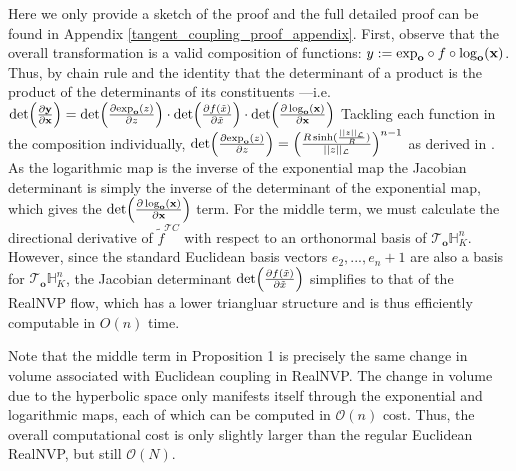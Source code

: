 \begin{proofsketch}
Here we only provide a sketch of the proof and the full detailed proof can be found in Appendix \ref{tangent_coupling_proof_appendix}. First, observe  that the overall transformation  is a valid composition of functions: $y := \textnormal{exp}_{\textbf{o}} \circ f\circ \log_{\textbf{o}}(\textbf{x})$. Thus, by chain rule and the identity that the determinant of a product is the product of the determinants of its constituents ---i.e.  $\textnormal{det}\Big (\frac{\partial \textbf{y}}{\partial \textbf{x}}\Big) =  \textnormal{det}\Big (\frac{\partial \textnormal{exp}_{\textbf{o}}(z)}{\partial z}\Big) \cdot \textnormal{det}\Big (\frac{\partial f(\tilde{x})}{\partial \tilde{x}}\Big) \cdot  \textnormal{det}\Big (\frac{\partial \log_{\textbf{o}}(\textbf{x})}{\partial \textbf{x}}\Big)$ Tackling each function in the composition individually, $\textnormal{det}\Big (\frac{\partial \textnormal{exp}_{\textbf{o}}(z)}{\partial z}\Big) = \Big(\frac{R\sinh(\frac{||z||_{\mathcal{L}}}{R})}{||z||_{\mathcal{L}}}\Big)^{n-1}$ as derived in \cite{skopek2019mixed}. As the logarithmic map is the inverse of the exponential map the Jacobian determinant is simply the inverse of the determinant of the exponential map, which gives the $\textnormal{det}\Big (\frac{\partial \log_{\textbf{o}}(\textbf{x})}{\partial \textbf{x}}\Big)$ term. 
For the middle term, we must calculate the directional derivative of $\tilde{f}^{\mathcal{T}C}$ with respect to an orthonormal basis of $\mathcal{T}_{\textbf{o}}\mathbb{H}^{n}_K$.
However, since the standard Euclidean basis vectors $e_2, ..., e_n+1$ are also a basis for $\mathcal{T}_{\textbf{o}}\mathbb{H}^{n}_K$, the Jacobian determinant $\textnormal{det}\Big (\frac{\partial f(\tilde{x})}{\partial \tilde{x}}\Big)$ simplifies to that of the RealNVP flow, which has a lower triangluar structure and is thus efficiently computable in $O(n)$ time.
\end{proofsketch}
Note that the middle term in Proposition 1 is precisely the same change in volume associated with Euclidean coupling in RealNVP.
The change in volume due to the hyperbolic space only manifests itself through the exponential and logarithmic maps, each of which can be computed in $\mathcal{O}(n)$ cost. Thus, the overall computational cost is only slightly larger than the regular Euclidean RealNVP, but still $\mathcal{O}(N)$.

